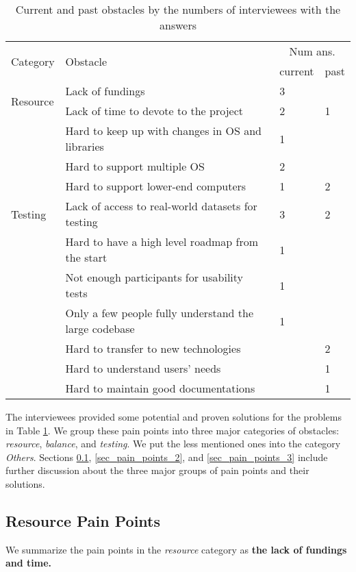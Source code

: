 \begin{table}[H]
\centering
\begin{tabular}{llll}
\hline
\multirow{2}{*}{Category} & \multirow{2}{*}{Obstacle} & \multicolumn{2}{c}{Num ans.} \\ \cline{3-4} 
 &  & current & past \\ \hline
\multirow{2}{*}{Resource} & Lack of fundings & 3 &  \\
 & Lack of time to devote to the project & 2 & 1 \\ \hdashline
\multirow{3}{*}{Balance} & Hard to keep up with changes in OS and libraries & 1 &  \\
 & Hard to support multiple OS & 2 &  \\
 & Hard to support lower-end computers & 1 & 2 \\ \hdashline
Testing & Lack of access to real-world datasets for testing & 3 & 2 \\ \hdashline
\multirow{7}{*}{Others}
 & Hard to have a high level roadmap from the start & 1 &  \\
 & Not enough participants for usability tests & 1 &  \\
 & Only a few people fully understand the large codebase & 1 &  \\
 & Hard to transfer to new technologies & & 2 \\
 & Hard to understand users' needs & & 1 \\
 & Hard to maintain good documentations & & 1 \\ \hline
\end{tabular}
\caption{\label{tab_obstacles}Current and past obstacles by the numbers of interviewees with the answers}
\end{table}

The interviewees provided some potential and proven solutions for the problems in Table \ref{tab_obstacles}. We group these pain points into three major categories of obstacles: \textit{resource}, \textit{balance}, and \textit{testing}. We put the less mentioned ones into the category \textit{Others}. Sections \ref{sec_pain_points_1}, \ref{sec_pain_points_2}, and \ref{sec_pain_points_3} include further discussion about the three major groups of pain points and their solutions.

\subsection{Resource Pain Points}
\label{sec_pain_points_1}
We summarize the pain points in the \textit{resource} category as
\textbf{the lack of fundings and time.}

